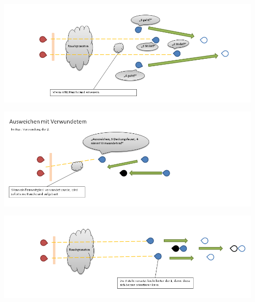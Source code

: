 \begin{minipage}[t]{1\textwidth}
	\includegraphics[width=\textwidth]{./Grafiken/Abschnitt/Ausweichen_aus_Kolonne_3.png}
\end{minipage}

\begin{minipage}[t]{1\textwidth}
	\includegraphics[width=\textwidth]{./Grafiken/Abschnitt/Ausweichen_aus_Kolonne_verletzt.png}
\end{minipage}

\begin{minipage}[t]{1\textwidth}
	\includegraphics[width=\textwidth]{./Grafiken/Abschnitt/Ausweichen_aus_Kolonne_verletzt_2.png}
\end{minipage}

